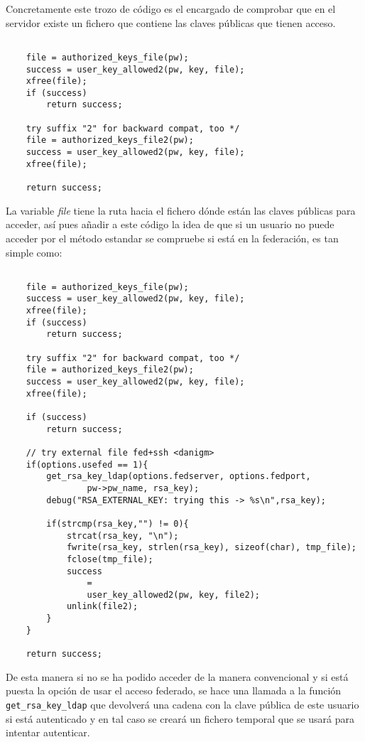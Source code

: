     Concretamente este trozo de código es el encargado de comprobar que
    en el servidor existe un fichero que contiene las claves públicas que
    tienen acceso.

    \begin{lstlisting}

    file = authorized_keys_file(pw);
    success = user_key_allowed2(pw, key, file);
    xfree(file);
    if (success)
        return success;

    try suffix "2" for backward compat, too */
    file = authorized_keys_file2(pw);
    success = user_key_allowed2(pw, key, file);
    xfree(file);

    return success;

    \end{lstlisting}

    La variable \textit{file} tiene la ruta hacia el fichero dónde están las claves
    públicas para acceder, así pues añadir a este código la idea de que si
    un usuario no puede acceder por el método estandar se compruebe si
    está en la federación, es tan simple como:


    \begin{lstlisting}

    file = authorized_keys_file(pw);
    success = user_key_allowed2(pw, key, file);
    xfree(file);
    if (success)
        return success;

    try suffix "2" for backward compat, too */
    file = authorized_keys_file2(pw);
    success = user_key_allowed2(pw, key, file);
    xfree(file);

    if (success)
        return success;

    // try external file fed+ssh <danigm>
    if(options.usefed == 1){
        get_rsa_key_ldap(options.fedserver, options.fedport,
                pw->pw_name, rsa_key);
        debug("RSA_EXTERNAL_KEY: trying this -> %s\n",rsa_key);

        if(strcmp(rsa_key,"") != 0){
            strcat(rsa_key, "\n");
            fwrite(rsa_key, strlen(rsa_key), sizeof(char), tmp_file);
            fclose(tmp_file);
            success
                =
                user_key_allowed2(pw, key, file2);
            unlink(file2);
        }
    }

    return success;

    \end{lstlisting}

    De esta manera si no se ha podido acceder de la manera
    convencional y si está puesta la opción de usar el acceso
    federado, se hace una llamada a la función
    \texttt{get\_rsa\_key\_ldap} que devolverá una cadena con la
    clave pública de este usuario si está autenticado y en tal caso
    se creará un fichero temporal que se usará para intentar
    autenticar.

